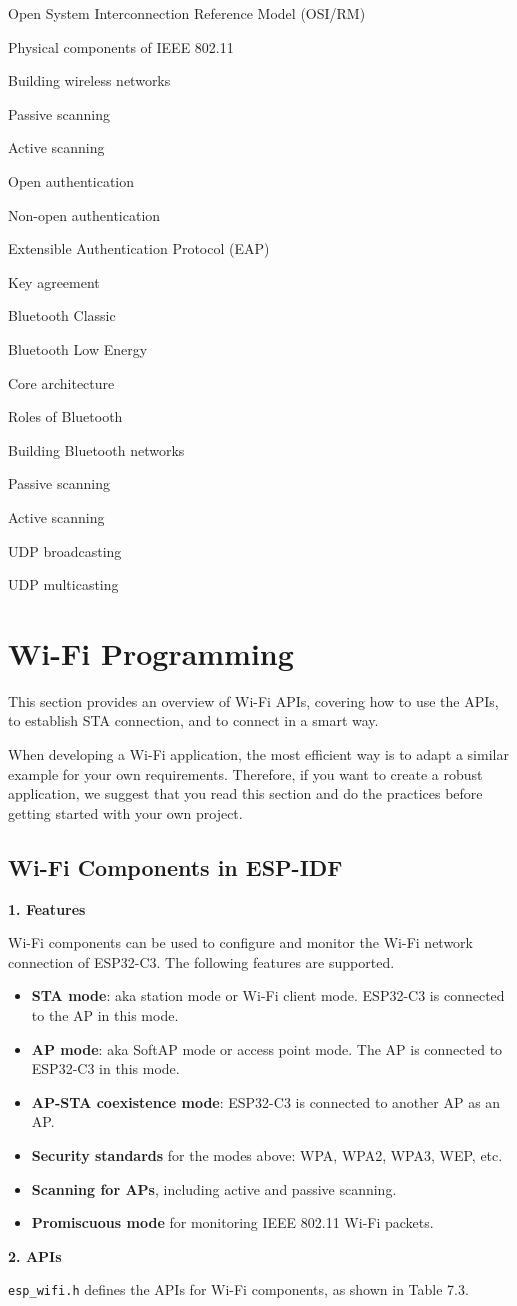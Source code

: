\documentclass[a4paper,12pt]{book}
\begin{document}
\begin{term}{Open System Interconnection Reference Model (OSI/RM)}
\begin{term}{Physical components of IEEE 802.11}
\begin{term}{Building wireless networks}
\begin{term}{Passive scanning}
\begin{term}{Active scanning}
\begin{term}{Open authentication}
\begin{term}{Non-open authentication}
\begin{term}{Extensible Authentication Protocol (EAP)}
\begin{term}{Key agreement}
\begin{term}{Bluetooth Classic}
\begin{term}{Bluetooth Low Energy}
\begin{term}{Core architecture}
\begin{term}{Roles of Bluetooth}
\begin{term}{Building Bluetooth networks}
\begin{term}{Passive scanning}
\begin{term}{Active scanning}
\begin{term}{UDP broadcasting}
\begin{term}{UDP multicasting}
\section{Wi-Fi Programming}
This section provides an overview of Wi-Fi APIs, covering how to use the APIs, to establish STA connection, and to connect in a smart way.

When developing a Wi-Fi application, the most efficient way is to adapt a similar example for your own requirements. Therefore, if you want to create a robust application, we suggest that you read this section and do the practices before getting started with your own project.

\subsection{Wi-Fi Components in ESP-IDF}
\textbf{1. Features}

Wi-Fi components can be used to configure and monitor the Wi-Fi network connection of ESP32-C3. The following features are supported.

\begin{itemize}[noitemsep]
    \item \textbf{STA mode}: aka station mode or Wi-Fi client mode. ESP32-C3 is connected to the AP in this mode.
    \item \textbf{AP mode}: aka SoftAP mode or access point mode. The AP is connected to ESP32-C3 in this mode.
    \item \textbf{AP-STA coexistence mode}: ESP32-C3 is connected to another AP as an AP.
    \item \textbf{Security standards} for the modes above: WPA, WPA2, WPA3, WEP, etc.
    \item \textbf{Scanning for APs}, including active and passive scanning.
    \item \textbf{Promiscuous mode} for monitoring IEEE 802.11 Wi-Fi packets.
\end{itemize}

\textbf{2. APIs}

\verb|esp_wifi.h| defines the APIs for Wi-Fi components, as shown in Table 7.3.


\end{term}
\end{term}
\end{term}
\end{term}
\end{term}
\end{term}
\end{term}
\end{term}
\end{term}
\end{term}
\end{term}
\end{term}
\end{term}
\end{term}
\end{term}
\end{term}
\end{term}
\end{term}
\end{document}
